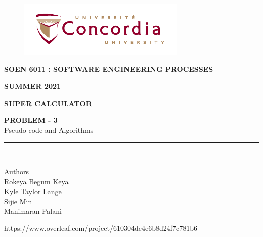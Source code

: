 \documentclass[a4paper, 11pt]{report}
\begin{document}
\begin{titlepage}
\vspace*{0.7in}
\begin{center}
\begin{figure}[htb]
\begin{center}
\includegraphics[width=8cm]{univ_logo}
\end{center}
\end{figure}
\vspace*{0.3in}
\begin{Large}
\textbf{SOEN 6011 : SOFTWARE ENGINEERING PROCESSES} \\
\end{Large}
\vspace*{0.1in}
\begin{Large}
\textbf{SUMMER 2021} \\
\end{Large}
\vspace*{0.9in}
\begin{Large}
\textbf{SUPER CALCULATOR} \\
\end{Large}
\vspace*{0.9in}
\begin{Large} 


\textbf{PROBLEM - 3} \\
Pseudo-code and Algorithms\\
\end{Large}
\vspace*{0.9in}
\rule{80mm}{0.1mm}\\
\vspace*{0.1in}
\begin{large}
Authors \\
\vspace*{0.1in}
Rokeya Begum Keya\\
\vspace*{0.1in}
Kyle Taylor Lange\\
\vspace*{0.1in}
Sijie Min\\
\vspace*{0.1in}
Manimaran Palani\\ 
\vspace*{0.3in}
\date{\normalsize\today} 
\end{large}
\end{center}
\begin{center}
https://www.overleaf.com/project/610304de4e6b8d24f7c781b6\end{center}
\end{titlepage}
\tableofcontents
\newpage
{}
\newpage
\end{document}
